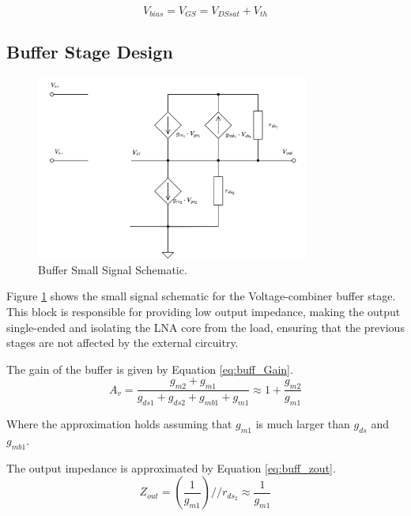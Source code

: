 \begin{equation}
    V_{bias} = V_{GS} = V_{DSsat} + V_{th}
    \label{eq:V_bias_CS}
\end{equation}


\subsection{Buffer Stage Design}

\begin{figure}[H]
    \centering
    \includegraphics[width=0.8\textwidth]{Images/BufferSmallSignal.png}
    \caption{Buffer Small Signal Schematic.}
    \label{fig:Buff_SmallSignal}
\end{figure}

Figure \ref{fig:Buff_SmallSignal} shows the small signal schematic for the Voltage-combiner buffer stage. This block is responsible for providing low output impedance, making the output single-ended and isolating the LNA core from the load, ensuring that the previous stages are not affected by the external circuitry.

The gain of the buffer is given by Equation \ref{eq:buff_Gain}.
\begin{equation}
    A_v =  \frac{g_{m2}+ g_{m1}}{g_{ds1}+g_{ds2}+g_{mb1}+g_{m1}} \approx 1 + \frac{g_{m2} }{g_{m1}}
    \label{eq:buff_Gain}
\end{equation}

Where the approximation holds assuming that $g_{m1}$ is much larger than $g_{ds}$ and $g_{mb1}$.

The output impedance is approximated by Equation \ref{eq:buff_zout}.
\begin{equation}
    Z_{out} = \left(\frac{1}{g_{m1}}\right) // r_{ds_2} \approx \frac{1}{g_{m1}}
    \label{eq:buff_zout}
\end{equation}

